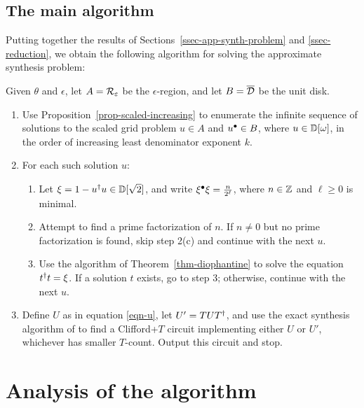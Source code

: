 \documentclass{article}
\begin{document}
\subsection{The main algorithm}

Putting together the results of Sections~\ref{ssec-app-synth-problem}
and {\ref{ssec-reduction}}, we obtain the following algorithm for
solving the approximate synthesis problem:

\begin{algorithm}\label{alg-main}
  Given $\theta$ and $\epsilon$, let $A={\cal R}_{\varepsilon}$ be the
  $\epsilon$-region, and let $B=\overline {\cal D}$ be the unit
  disk. 
  \begin{enumerate}
  \item[1.] Use Proposition~\ref{prop-scaled-increasing} to enumerate
    the infinite sequence of solutions to the scaled grid problem
    $u\in A$ and ${u}^{\bullet}\in B$, where $u\in{\mathbb{D}}[\omega]$, in the order
    of increasing least denominator exponent $k$. 
  \item[2.] For each such solution $u$:
    \begin{enumerate}
    \item[(a)] Let $\xi=1 - u^{\dagger} u\in{\mathbb{D}}[\sqrt2]$, and write
      $\xi^{\bullet}\xi=\frac{n}{2^\ell}$, where $n\in\mathbb{Z}$ and $\ell\geq 0$
      is minimal.
    \item[(b)] Attempt to find a prime factorization of
      $n$. If $n\neq 0$ but no prime factorization is found, skip step
      2(c) and continue with the next $u$.
    \item[(c)] Use the algorithm of Theorem~\ref{thm-diophantine} to
      solve the equation $t^{\dagger} t = \xi$. If a solution $t$ exists,
      go to step 3; otherwise, continue with the next $u$.
    \end{enumerate}
  \item[3.] Define $U$ as in equation {\eqref{eqn-u}}, let
      $U'=TUT^{\dagger}$, and use the exact synthesis algorithm of
      {\cite{Kliuchnikov-etal}} to find a Clifford+$T$ circuit
      implementing either $U$ or $U'$, whichever has smaller
      $T$-count. Output this circuit and stop.
  \end{enumerate}
\end{algorithm}

\section{Analysis of the algorithm}
\label{sec-analysis}
\end{document}
